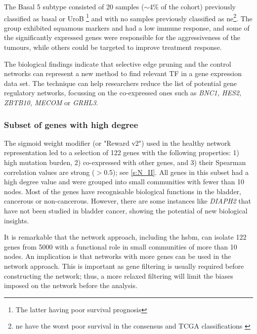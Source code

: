 The Basal 5 subtype consisted of 20 samples ($\sim$4\% of the cohort) previously classified as basal \citep{Kamoun2020-tj,Robertson2017-mg} or UroB \citep{Marzouka2018-ge}\footnote{The latter having poor survival prognosis} and with no samples previously classified as \acrlong{ne}\footnote{\acrlong{ne} have the worst poor survival in the consensus and TCGA classifications \citep{Kamoun2020-tj,Robertson2017-mg}}. The group exhibited squamous markers and had a low immune response, and some of the significantly expressed genes were responsible for the aggressiveness of the tumours, while others could be targeted to improve treatment response.

The biological findings indicate that selective edge pruning and the control networks can represent a new method to find relevant \gls{TF} in a gene expression data set. The technique can help researchers reduce the list of potential gene regulatory networks, focussing on the co-expressed ones such as \textit{BNC1, HES2, ZBTB10, MECOM} or \textit{GRHL3}.

\subsubsection*{Subset of genes with high degree}

The sigmoid weight modifier (or "Reward v2") used in the healthy network representation led to a selection of 122 genes with the following properties: 1) high mutation burden, 2) co-expressed with other genes, and 3) their Spearman correlation values are strong (\(>\)0.5); see \cref{s:N_II}. All genes in this subset had a high degree value and were grouped into small communities with fewer than 10 nodes. Most of the genes have recognisable biological functions in the bladder, cancerous or non-cancerous. However, there are some instances like \textit{DIAPH2} that have not been studied in bladder cancer, showing the potential of new biological insights.

It is remarkable that the network approach, including the \acrshort{hsbm}, can isolate 122 genes from 5000 with a functional role in small communities of more than 10 nodes. An implication is that networks with more genes can be used in the network approach. This is important as gene filtering is usually required before constructing the network; thus, a more relaxed filtering will limit the biases imposed on the network before the analysis.

